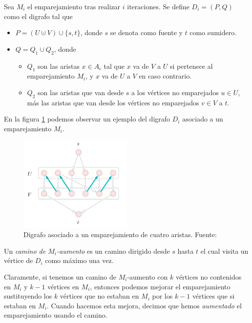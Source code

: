 \begin{definition}
Sea $M_i$ el emparejamiento tras realizar $i$ iteraciones. Se define $D_i = (P, Q)$ como el digrafo tal que
\begin{itemize}
	\item $P= (U \cupdot V) \cup \{s, t\}$, donde $s$ se denota como fuente y $t$ como sumidero.
	\item $Q = Q_1 \cup Q_2$, donde 
	\begin{itemize}
		\item $Q_1$ son las aristas $x \in A_\epsilon$ tal que $x$ va de $V$ a $U$ si pertenece al emparejamiento $M_i$, y $x$ va de $U$ a $V$ en caso contrario.
		\item $Q_2$ son las aristas que van desde $s$ a los vértices no emparejados $u \in U$, más las aristas que van desde los vértices no emparejados $v \in V$ a $t$.
	\end{itemize}
\end{itemize}

\end{definition}

En la figura \ref{ref:ejEmparejamiento} podemos observar un ejemplo del digrafo $D_i$ asociado a un emparejamiento $M_i$.

\begin{figure}[!ht]
\centering
\includegraphics[width=0.5\textwidth]{include/figuras/emparejamiento.png} 
\caption{Digrafo asociado a un emparejamiento de cuatro aristas. Fuente: \cite{libroEH}}
\label{ref:ejEmparejamiento}
\end{figure}  

\begin{definition}
Un \emph{camino de $M_i$-aumento} es un camino dirigido desde $s$ hasta $t$ el cual visita un vértice de $D_i$ como máximo una vez.
\end{definition}

Claramente, si tenemos un camino de $M_i$-aumento con $k$ vértices no contenidos en $M_i$ y $k-1$ vértices en $M_i$, entonces podemos mejorar el emparejamiento sustituyendo los $k$ vértices que no estaban en $M_i$ por los $k-1$ vértices que si estaban en $M_i$. Cuando hacemos esta mejora, decimos que hemos \emph{aumentado} el emparejamiento usando el camino. 

